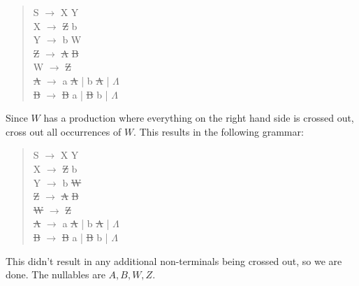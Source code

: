\documentclass[letterpaper,12pt,openany,reqno]{book}%
\begin{document}
\begin{quote}
{\ttfamily S} $\rightarrow$ {\ttfamily X Y}\\
{\ttfamily X} $\rightarrow$ {\ttfamily \sout{Z} b}\\
{\ttfamily Y} $\rightarrow$ {\ttfamily b W}\\
{\ttfamily \sout{Z}} $\rightarrow$ {\ttfamily \sout{A} \sout{B}}\\
{\ttfamily W} $\rightarrow$ {\ttfamily \sout{Z}}\\
{\ttfamily \sout{A}} $\rightarrow$ {\ttfamily a \sout{A} | b \sout{A} | $\Lambda$}\\
{\ttfamily \sout{B}} $\rightarrow$ {\ttfamily \sout{B} a | \sout{B} b | $\Lambda$}\\
\end{quote}
Since $W$ has a production where everything on the right hand side is crossed out, cross out all occurrences of $W$. This results in the following grammar:
\begin{quote}
{\ttfamily S} $\rightarrow$ {\ttfamily X Y}\\
{\ttfamily X} $\rightarrow$ {\ttfamily \sout{Z} b}\\
{\ttfamily Y} $\rightarrow$ {\ttfamily b \sout{W}}\\
{\ttfamily \sout{Z}} $\rightarrow$ {\ttfamily \sout{A} \sout{B}}\\
{\ttfamily \sout{W}} $\rightarrow$ {\ttfamily \sout{Z}}\\
{\ttfamily \sout{A}} $\rightarrow$ {\ttfamily a \sout{A} | b \sout{A} | $\Lambda$}\\
{\ttfamily \sout{B}} $\rightarrow$ {\ttfamily \sout{B} a | \sout{B} b | $\Lambda$}\\
\end{quote}
This didn't result in any additional non-terminals being crossed out, so we are done. The nullables are $A, B, W, Z$.
\end{document}
